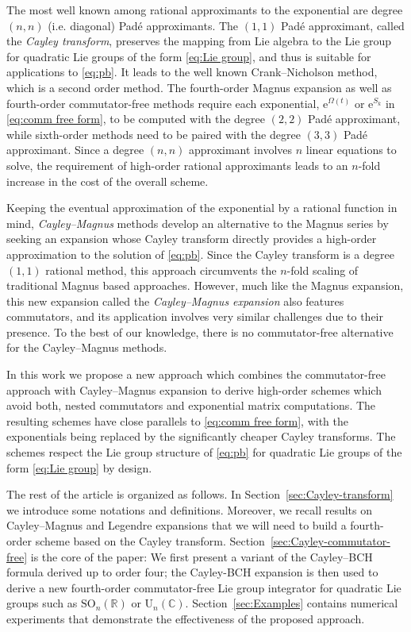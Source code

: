 \documentclass{article}
\newcommand{\R}{\mathbb{R}}
\newcommand{\C}{\mathbb{C}}
\newcommand{\Om}{\Omega}
\begin{document}
{The most well known among rational approximants to the exponential are degree $(n,n)$ (i.e. diagonal) Pad\'{e} approximants. 
The $(1,1)$ Pad\'{e} approximant, called the {\em Cayley transform}, preserves the mapping from Lie algebra to the Lie group for quadratic Lie groups of the form \eqref{eq:Lie group}, and thus is suitable for applications to \eqref{eq:pb}. It leads to the well known Crank--Nicholson method, which is a second order method. The fourth-order Magnus expansion as well as fourth-order commutator-free methods require each exponential, $\mathrm{e}^{\Om(t)}$ or $\mathrm{e}^{S_k}$ in \eqref{eq:comm free form}, to be computed with the degree $(2,2)$ Pad\'{e} approximant, while sixth-order methods need to be paired with the degree $(3,3)$ Pad\'{e} approximant. Since a degree $(n,n)$ approximant involves $n$ linear equations to solve, the requirement of high-order rational approximants leads to an $n$-fold increase in the cost of the overall scheme.
%

Keeping the eventual approximation of the exponential by a rational function in mind, {\em Cayley--Magnus} methods \cite{DLP:1998, Iserles:2001} develop an alternative to the Magnus series by seeking an expansion whose Cayley transform directly provides a high-order approximation to the solution of \eqref{eq:pb}. Since the Cayley transform is a degree $(1,1)$ rational method, this approach circumvents the $n$-fold scaling of traditional Magnus based approaches. However, much like the Magnus expansion, this new expansion called the {\em Cayley--Magnus expansion} also features commutators, and its application involves very similar challenges due to their presence. 
To the best of our knowledge, there is no commutator-free alternative for the Cayley--Magnus methods.

In this work we propose a new approach which combines the commutator-free approach with Cayley--Magnus expansion to derive high-order schemes which avoid both, nested commutators and exponential matrix computations. The resulting schemes have close parallels to \eqref{eq:comm free form}, with the exponentials being replaced by the significantly cheaper Cayley transforms. The schemes respect the Lie group structure of \eqref{eq:pb} for quadratic Lie groups of the form \eqref{eq:Lie group} by design. 

The rest of the article is organized as follows. In Section~\ref{sec:Cayley-transform} we introduce some notations and definitions. Moreover, we recall results on Cayley--Magnus and Legendre expansions that we will need to build a fourth-order scheme based on the Cayley transform. Section~\ref{sec:Cayley-commutator-free} is the core of the paper: We first present a variant of the Cayley--BCH formula derived up to order four; the Cayley-BCH expansion is then used to derive a new fourth-order commutator-free Lie group integrator for quadratic Lie groups such as $\mathrm{SO}_n(\R)$ or $\mathrm{U}_n(\C)$. Section~\ref{sec:Examples} contains numerical experiments that demonstrate the effectiveness of the proposed approach.



}
\end{document}
